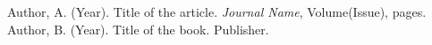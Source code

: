  Author, A. (Year). Title of the article. \textit{Journal Name}, Volume(Issue), pages.
 Author, B. (Year). Title of the book. Publisher.
